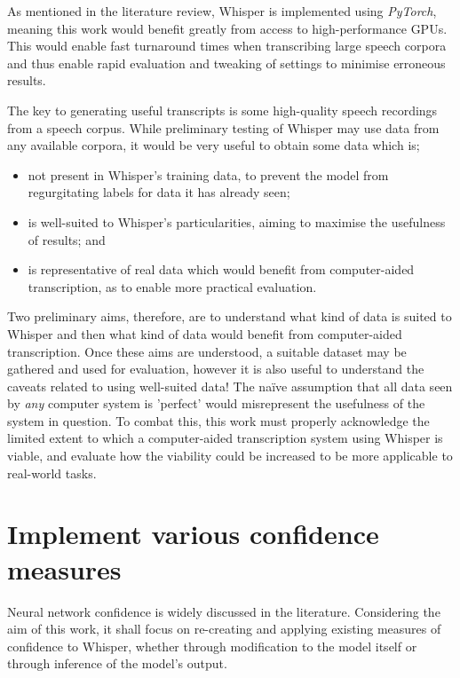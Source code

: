 As mentioned in the literature review, Whisper is implemented using \emph{PyTorch}, meaning this work would benefit greatly from access to high-performance GPUs.
This would enable fast turnaround times when transcribing large speech corpora and thus enable rapid evaluation and tweaking of settings to minimise erroneous results.

The key to generating useful transcripts is some high-quality speech recordings from a speech corpus.
While preliminary testing of Whisper may use data from any available corpora, it would be very useful to obtain some data which is;

\begin{itemize}
        \item not present in Whisper's training data, to prevent the model from regurgitating labels for data it has already seen;
        \item is well-suited to Whisper's particularities, aiming to maximise the usefulness of results; and
        \item is representative of real data which would benefit from computer-aided transcription, as to enable more practical evaluation.
\end{itemize}

Two preliminary aims, therefore, are to understand what kind of data is suited to Whisper and then what kind of data would benefit from computer-aided transcription.
Once these aims are understood, a suitable dataset may be gathered and used for evaluation, however it is also useful to understand the caveats related to using well-suited data!
The na\"{i}ve assumption that all data seen by \emph{any} computer system is 'perfect' would misrepresent the usefulness of the system in question.
To combat this, this work must properly acknowledge the limited extent to which a computer-aided transcription system using Whisper is viable, and evaluate how the viability could be increased to be more applicable to real-world tasks.

\section{Implement various confidence measures}

Neural network confidence is widely discussed in the literature.
Considering the aim of this work, it shall focus on re-creating and applying existing measures of confidence to Whisper, whether through modification to the model itself or through inference of the model's output.

